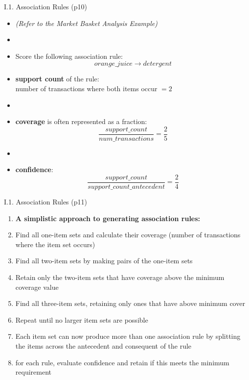 \documentclass[handout]{beamer}
\newcommand{\strong}[1]{\textbf{\color{teal} #1}}
\begin{document}
\begin{frame}{I.1. Association Rules (p10)}
\begin{itemize}
\item[] \emph{(Refer to the Market Basket Analysis Example)}
\item[]
\item Score the following association rule:
\[
	orange\_juice \rightarrow detergent
\]
\item \strong{support count} of the rule:\\
	number of transactions where both items occur $=2$
\item[]
\item \strong{coverage} is often represented as a fraction:
\[
	\frac{support\_count}{num\_transactions} = \frac{2}{5}
\]
\item[]
\item \strong{confidence}: 
\[
	\frac{support\_count}{support\_count\_antecedent} = \frac{2}{4}
\]
\end{itemize}
\end{frame}
\begin{frame}{I.1. Association Rules (p11)}
\begin{enumerate}
\item[] \strong{A simplistic approach to generating association rules:}
\item Find all one-item sets and calculate their coverage (number of transactions where the item set occurs)
\item Find all two-item sets by making pairs of the one-item sets
\item Retain only the two-item sets that have coverage above the minimum coverage value
\item Find all three-item sets, retaining only ones that have above minimum cover
\item Repeat until no larger item sets are possible
\item Each item set can now produce more than one association rule by splitting the items across the antecedent and consequent of the rule
\item for each rule, evaluate confidence and retain if this meets the minimum requirement
\end{enumerate}
\end{frame}
\end{document}
